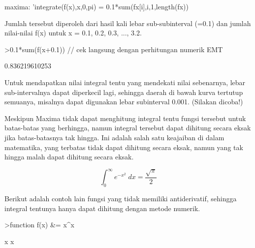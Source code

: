 \documentclass[a4paper,10pt]{article}
\begin{document}
\begin{eulernotebook}
\begin{eulercomment}
\begin{eulercomment}
\begin{eulercomment}
\begin{eulercomment}
\begin{eulercomment}
\begin{eulercomment}
\begin{eulercomment}
\begin{eulercomment}
\begin{eulercomment}
maxima: 'integrate(f(x),x,0,pi) = 0.1*sum(fx[i],i,1,length(fx))

Jumlah tersebut diperoleh dari hasil kali lebar sub-subinterval (=0.1)
dan jumlah nilai-nilai f(x) untuk x = 0.1, 0.2, 0.3, ..., 3.2.
\end{eulercomment}
\begin{eulerprompt}
>0.1*sum(f(x+0.1)) // cek langsung dengan perhitungan numerik EMT
\end{eulerprompt}
\begin{euleroutput}
  0.836219610253
\end{euleroutput}
\begin{eulercomment}
Untuk mendapatkan nilai integral tentu yang mendekati nilai sebenarnya, lebar
sub-intervalnya dapat diperkecil lagi, sehingga daerah di bawah kurva tertutup
semuanya, misalnya dapat digunakan lebar subinterval 0.001. (Silakan dicoba!)

Meskipun Maxima tidak dapat menghitung integral tentu fungsi tersebut untuk
batas-batas yang berhingga, namun integral tersebut dapat dihitung secara eksak jika
batas-batasnya tak hingga. Ini adalah salah satu keajaiban di dalam matematika, yang
terbatas tidak dapat dihitung secara eksak, namun yang tak hingga malah dapat
dihitung secara eksak.
\end{eulercomment}
\begin{eulerformula}
\[
\int_{0}^{\infty }{e^ {- x^2 }\;dx}=\frac{\sqrt{\pi}}{2}
\]
\end{eulerformula}
\begin{eulercomment}
Berikut adalah contoh lain fungsi yang tidak memiliki antiderivatif, sehingga
integral tentunya hanya dapat dihitung dengan metode numerik.
\end{eulercomment}
\begin{eulerprompt}
>function f(x) &= x^x
\end{eulerprompt}
\begin{euleroutput}
  
                                     x
                                    x
  

\end{euleroutput}
\end{eulercomment}
\end{eulercomment}
\end{eulercomment}
\end{eulercomment}
\end{eulercomment}
\end{eulercomment}
\end{eulercomment}
\end{eulercomment}
\end{eulernotebook}
\end{document}
